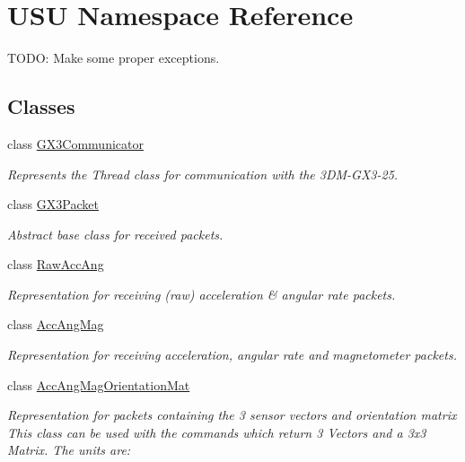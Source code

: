 \hypertarget{namespace_u_s_u}{\section{\-U\-S\-U \-Namespace \-Reference}
\label{namespace_u_s_u}
}


\-T\-O\-D\-O\-: \-Make some proper exceptions.  


\subsection*{\-Classes}
\begin{DoxyCompactItemize}
\item 
class \hyperlink{class_u_s_u_1_1_g_x3_communicator}{\-G\-X3\-Communicator}
\begin{DoxyCompactList}\small\item\em \-Represents the \-Thread class for communication with the 3\-D\-M-\/\-G\-X3-\/25. \end{DoxyCompactList}\item 
class \hyperlink{class_u_s_u_1_1_g_x3_packet}{\-G\-X3\-Packet}
\begin{DoxyCompactList}\small\item\em \-Abstract base class for received packets. \end{DoxyCompactList}\item 
class \hyperlink{class_u_s_u_1_1_raw_acc_ang}{\-Raw\-Acc\-Ang}
\begin{DoxyCompactList}\small\item\em \-Representation for receiving (raw) acceleration \& angular rate packets. \end{DoxyCompactList}\item 
class \hyperlink{class_u_s_u_1_1_acc_ang_mag}{\-Acc\-Ang\-Mag}
\begin{DoxyCompactList}\small\item\em \-Representation for receiving acceleration, angular rate and magnetometer packets. \end{DoxyCompactList}\item 
class \hyperlink{class_u_s_u_1_1_acc_ang_mag_orientation_mat}{\-Acc\-Ang\-Mag\-Orientation\-Mat}
\begin{DoxyCompactList}\small\item\em \-Representation for packets containing the 3 sensor vectors and orientation matrix \-This class can be used with the commands which return 3 \-Vectors and a 3x3 \-Matrix. \-The units are\-: \end{DoxyCompactList}\item 

\end{DoxyCompactItemize}
